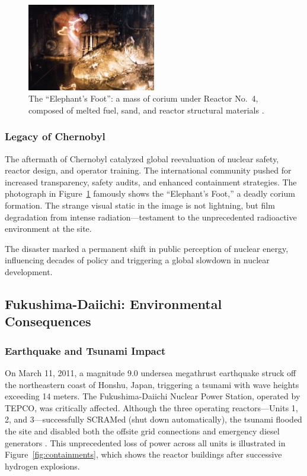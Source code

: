 \documentclass[12pt]{article}
\begin{document}
\begin{figure}[H]
  \centering
  \includegraphics[width=0.5\textwidth]{elephantsfoot.png}
  \caption{The ``Elephant’s Foot'': a mass of corium under Reactor No.~4, composed of melted fuel, sand, and reactor structural materials \autocite{medvedev1991truth}.}
  \label{fig:elephantsfoot}
\end{figure}

\subsubsection{Legacy of Chernobyl}
The aftermath of Chernobyl catalyzed global reevaluation of nuclear safety, reactor design, and operator training. The international community pushed for increased transparency, safety audits, and enhanced containment strategies. The photograph in Figure~\ref{fig:elephantsfoot} famously shows the “Elephant’s Foot,” a deadly corium formation. The strange visual static in the image is not lightning, but film degradation from intense radiation—testament to the unprecedented radioactive environment at the site.

The disaster marked a permanent shift in public perception of nuclear energy, influencing decades of policy and triggering a global slowdown in nuclear development.

\subsection{Fukushima-Daiichi: Environmental Consequences}

\subsubsection{Earthquake and Tsunami Impact}
On March 11, 2011, a magnitude 9.0 undersea megathrust earthquake struck off the northeastern coast of Honshu, Japan, triggering a tsunami with wave heights exceeding 14 meters. The Fukushima-Daiichi Nuclear Power Station, operated by TEPCO, was critically affected. Although the three operating reactors—Units 1, 2, and 3—successfully SCRAMed (shut down automatically), the tsunami flooded the site and disabled both the offsite grid connections and emergency diesel generators \autocite{iaea_fukushima_report}. This unprecedented loss of power across all units is illustrated in Figure~\ref{fig:containments}, which shows the reactor buildings after successive hydrogen explosions.
\end{document}
